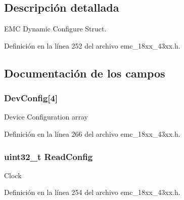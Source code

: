 \subsection{Descripción detallada}
E\+MC Dynamic Configure Struct. 

Definición en la línea 252 del archivo emc\+\_\+18xx\+\_\+43xx.\+h.



\subsection{Documentación de los campos}
\subsubsection[{\texorpdfstring{Dev\+Config}{DevConfig}}]{ Dev\+Config\mbox{[}4\mbox{]}}\hypertarget{struct_i_p___e_m_c___d_y_n___c_o_n_f_i_g___t_a57b1df2b47c607c29b88fd8542f1e9d5}{}\label{struct_i_p___e_m_c___d_y_n___c_o_n_f_i_g___t_a57b1df2b47c607c29b88fd8542f1e9d5}
Device Configuration array 

Definición en la línea 266 del archivo emc\+\_\+18xx\+\_\+43xx.\+h.

\subsubsection[{\texorpdfstring{Read\+Config}{ReadConfig}}]{\setlength{\rightskip}{0pt plus 5cm}uint32\+\_\+t Read\+Config}\hypertarget{struct_i_p___e_m_c___d_y_n___c_o_n_f_i_g___t_a76b76d1dc1cfb73c316fb127935181e6}{}\label{struct_i_p___e_m_c___d_y_n___c_o_n_f_i_g___t_a76b76d1dc1cfb73c316fb127935181e6}
Clock 

Definición en la línea 254 del archivo emc\+\_\+18xx\+\_\+43xx.\+h.

